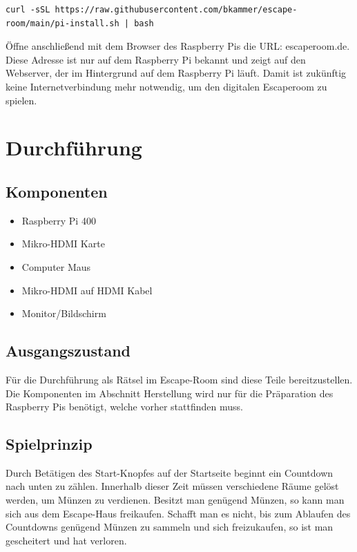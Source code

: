 \documentclass[12pt, letterpaper]{article}
\begin{document}
\begin{verbatim}
curl -sSL https://raw.githubusercontent.com/bkammer/escape-room/main/pi-install.sh | bash
\end{verbatim}

Öffne anschließend mit dem Browser des Raspberry Pis die URL: escaperoom.de.
Diese Adresse ist nur auf dem Raspberry Pi bekannt und zeigt auf den Webserver, der im Hintergrund auf dem Raspberry Pi läuft.
Damit ist zukünftig keine Internetverbindung mehr notwendig, um den digitalen Escaperoom zu spielen.

\section{Durchführung}
\subsection{Komponenten}

\begin{itemize}
	\item Raspberry Pi 400
    \item Mikro-HDMI Karte
	\item Computer Maus
	\item Mikro-HDMI auf HDMI Kabel
	\item Monitor/Bildschirm
\end{itemize}

\subsection{Ausgangszustand}

Für die Durchführung als Rätsel im Escape-Room sind diese Teile bereitzustellen.
Die Komponenten im Abschnitt Herstellung wird nur für die Präparation des Raspberry Pis benötigt, welche vorher stattfinden muss.

\subsection{Spielprinzip}

Durch Betätigen des Start-Knopfes auf der Startseite beginnt ein Countdown nach unten zu zählen.
Innerhalb dieser Zeit müssen verschiedene Räume gelöst werden, um Münzen zu verdienen.
Besitzt man genügend Münzen, so kann man sich aus dem Escape-Haus freikaufen.
Schafft man es nicht, bis zum Ablaufen des Countdowns genügend Münzen zu sammeln und sich freizukaufen, so ist man gescheitert und hat verloren.
\end{document}

